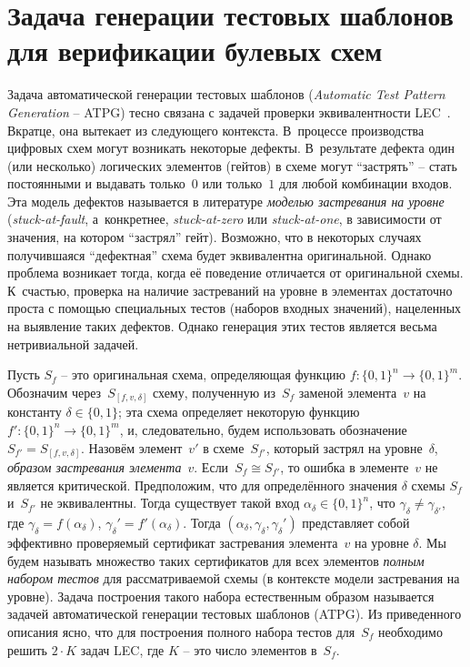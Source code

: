 

\section{Задача генерации тестовых шаблонов для верификации булевых схем}
\label{sec:atpg}

Задача автоматической генерации тестовых шаблонов (\textit{Automatic Test Pattern Generation} \--- ATPG) тесно связана с задачей проверки эквивалентности LEC~\cite{drechsler2021}.
Вкратце, она вытекает из следующего контекста.
В~процессе производства цифровых схем могут возникать некоторые дефекты.
В~результате дефекта один (или несколько) логических элементов (гейтов) в схеме могут \enquote{застрять} \--- стать постоянными и выдавать только~$0$ или только~$1$ для любой комбинации входов.
Эта модель дефектов называется в литературе \textit{моделью застревания на уровне} (\textit{stuck-at-fault}, а~конкретнее, \textit{stuck-at-zero} или \textit{stuck-at-one}, в зависимости от значения, на котором \enquote{застрял} гейт).
Возможно, что в некоторых случаях получившаяся \enquote{дефектная} схема будет эквивалентна оригинальной.
Однако проблема возникает тогда, когда её поведение отличается от оригинальной схемы.
К~счастью, проверка на наличие застреваний на уровне в элементах достаточно проста с помощью специальных тестов (наборов входных значений), нацеленных на выявление таких дефектов.
Однако генерация этих тестов является весьма нетривиальной задачей.

Пусть $S_f$ \--- это оригинальная схема, определяющая функцию $f \colon \{0,1\}^n \to \{0,1\}^m$.
Обозначим через~$S_{[f,v,\delta]}$ схему, полученную из~$S_f$ заменой элемента~$v$ на константу $\delta \in \{0,1\}$; эта схема определяет некоторую функцию $f' \colon \{0,1\}^n \to \{0,1\}^m$, и, следовательно, будем использовать обозначение $S_{f'} = S_{[f,v,\delta]}$.
Назовём элемент~$v'$ в схеме~$S_{f'}$, который застрял на уровне~$\delta$, \textit{образом застревания элемента}~$v$.
Если~$S_f \cong S_{f'}$, то ошибка в элементе~$v$ не является критической.
Предположим, что для определённого значения $\delta$ схемы $S_f$ и~$S_{f'}$ не эквивалентны.
Тогда существует такой вход $\alpha_\delta \in \{0,1\}^n$, что $\gamma_\delta \neq \gamma_{\delta'}$, где $\gamma_\delta = f(\alpha_\delta)$, $\gamma_\delta' = f'(\alpha_\delta)$.
Тогда $(\alpha_\delta, \gamma_\delta, \gamma_\delta')$ представляет собой эффективно проверяемый сертификат застревания элемента~$v$ на уровне $\delta$.
Мы будем называть множество таких сертификатов для всех элементов \textit{полным набором тестов} для рассматриваемой схемы (в контексте модели застревания на уровне).
Задача построения такого набора естественным образом называется задачей автоматической генерации тестовых шаблонов (ATPG).
Из приведенного описания ясно, что для построения полного набора тестов для~$S_f$ необходимо решить $2 \cdot K$ задач LEC, где $K$ \--- это число элементов в~$S_f$.

